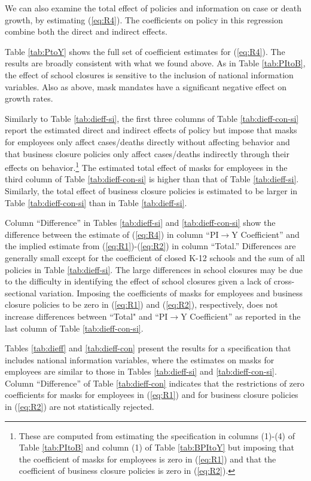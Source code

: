 \documentclass[3p, longtitle]{elsarticle}
\theoremstyle{definition}
\renewcommand{\to}{{\rightarrow}}
\begin{document}
We can also examine the total effect of policies and information on
case  or death growth, by estimating (\ref{eq:R4}). The coefficients on policy
in this regression combine both the direct and indirect effects.

Table \ref{tab:PtoY} shows
the full set of coefficient estimates for
(\ref{eq:R4}). The results are broadly consistent with what we found
above.  As in Table \ref{tab:PItoB}, the effect of school closures is
sensitive to the inclusion of national information variables.  Also as
above, mask mandates have a significant negative effect on growth
rates.

Similarly to Table  \ref{tab:dieff-si}, the first three columns of  Table \ref{tab:dieff-con-si} report  the estimated direct and indirect effects of policy but impose that masks for employees only affect cases/deaths directly without affecting behavior and that business closure policies only affect  cases/deaths indirectly through their effects on behavior.\footnote{These are computed from estimating the specification in columns (1)-(4) of
Table \ref{tab:PItoB} and column (1) of Table \ref{tab:BPItoY} but imposing that the coefficient of masks for employees is zero in (\ref{eq:R1}) and that the coefficient of business closure policies is zero in (\ref{eq:R2}).} The estimated total effect of masks for employees in the third column of Table \ref{tab:dieff-con-si} is higher than that of Table  \ref{tab:dieff-si}. Similarly, the total effect of business closure policies is estimated to be larger in Table \ref{tab:dieff-con-si} than in  Table  \ref{tab:dieff-si}.

Column ``Difference''  in Tables   \ref{tab:dieff-si} and \ref{tab:dieff-con-si}  show the
difference between the estimate of (\ref{eq:R4}) in column  ``PI$\to$Y Coefficient''   and the implied estimate from
(\ref{eq:R1})-(\ref{eq:R2}) in   column ``Total.''   Differences  are generally small except for the coefficient of closed K-12 schools and  the sum of all policies in Table   \ref{tab:dieff-si}. The large differences in school closures  may be due to the  difficulty in identifying the effect of school closures given a lack of cross-sectional variation. Imposing the coefficients of masks for employees and business closure policies to be zero in (\ref{eq:R1}) and  (\ref{eq:R2}), respectively, does not increase differences between  ``Total" and  ``PI$\to$Y Coefficient''  as reported in the last column of  Table \ref{tab:dieff-con-si}.

 Tables  \ref{tab:dieff} and \ref{tab:dieff-con}  present the results for a specification that includes national information variables, where the estimates on masks for employees are similar to those in  Tables  \ref{tab:dieff-si} and \ref{tab:dieff-con-si}. Column ``Difference''  of Table \ref{tab:dieff-con} indicates that the restrictions of zero coefficients for masks for employees in (\ref{eq:R1}) and for business closure policies in  (\ref{eq:R2}) are not statistically rejected.
\end{document}
